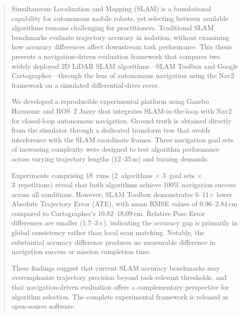 \documentclass[12pt,letterpaper]{report}
\begin{document}
\begin{abstract}

Simultaneous Localization and Mapping (SLAM) is a foundational capability for autonomous mobile robots, yet selecting between available algorithms remains challenging for practitioners. Traditional SLAM benchmarks evaluate trajectory accuracy in isolation, without examining how accuracy differences affect downstream task performance. This thesis presents a navigation-driven evaluation framework that compares two widely deployed 2D LiDAR SLAM algorithms---SLAM Toolbox and Google Cartographer---through the lens of autonomous navigation using the Nav2 framework on a simulated differential-drive rover.

We developed a reproducible experimental platform using Gazebo Harmonic and ROS~2 Jazzy that integrates SLAM-in-the-loop with Nav2 for closed-loop autonomous navigation. Ground truth is obtained directly from the simulator through a dedicated transform tree that avoids interference with the SLAM coordinate frames. Three navigation goal sets of increasing complexity were designed to test algorithm performance across varying trajectory lengths (12--35\,m) and turning demands.

Experiments comprising 18~runs (2~algorithms $\times$ 3~goal sets $\times$ 3~repetitions) reveal that both algorithms achieve 100\% navigation success across all conditions. However, SLAM Toolbox demonstrates 6--11$\times$ lower Absolute Trajectory Error (ATE), with mean RMSE values of 0.96--2.84\,cm compared to Cartographer's 10.82--18.09\,cm. Relative Pose Error differences are smaller (1.7--3$\times$), indicating the accuracy gap is primarily in global consistency rather than local scan matching. Notably, the substantial accuracy difference produces no measurable difference in navigation success or mission completion time.

These findings suggest that current SLAM accuracy benchmarks may overemphasize trajectory precision beyond task-relevant thresholds, and that navigation-driven evaluation offers a complementary perspective for algorithm selection. The complete experimental framework is released as open-source software.

\end{abstract}

\tableofcontents
\listoffigures
\listoftables











\end{document}
